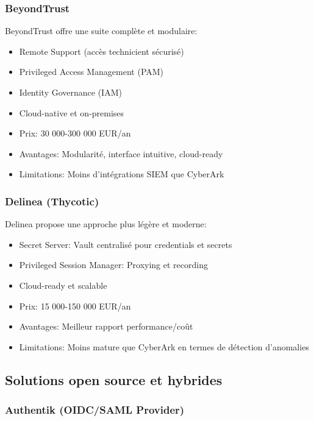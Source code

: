 \subsubsection{BeyondTrust}

BeyondTrust offre une suite complète et modulaire:
\begin{itemize}
    \item Remote Support (accès technicient sécurisé)
    \item Privileged Access Management (PAM)
    \item Identity Governance (IAM)
    \item Cloud-native et on-premises
    \item Prix: 30 000-300 000 EUR/an
    \item Avantages: Modularité, interface intuitive, cloud-ready
    \item Limitations: Moins d'intégrations SIEM que CyberArk
\end{itemize}

\subsubsection{Delinea (Thycotic)}

Delinea propose une approche plus légère et moderne:
\begin{itemize}
    \item Secret Server: Vault centralisé pour credentials et secrets
    \item Privileged Session Manager: Proxying et recording
    \item Cloud-ready et scalable
    \item Prix: 15 000-150 000 EUR/an
    \item Avantages: Meilleur rapport performance/coût
    \item Limitations: Moins mature que CyberArk en termes de détection d'anomalies
\end{itemize}

\subsection{Solutions open source et hybrides}

\subsubsection{Authentik (OIDC/SAML Provider)}

